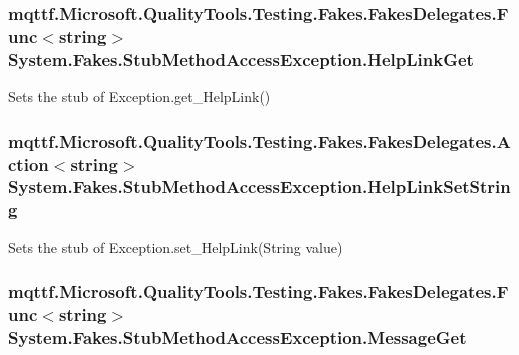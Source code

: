 \hypertarget{class_system_1_1_fakes_1_1_stub_method_access_exception_a0f5613a9a38d11a0047361aa8dcf5e5b}{
\subsubsection[{Help\-Link\-Get}]{\setlength{\rightskip}{0pt plus 5cm}mqttf.\-Microsoft.\-Quality\-Tools.\-Testing.\-Fakes.\-Fakes\-Delegates.\-Func$<$string$>$ System.\-Fakes.\-Stub\-Method\-Access\-Exception.\-Help\-Link\-Get}}\label{class_system_1_1_fakes_1_1_stub_method_access_exception_a0f5613a9a38d11a0047361aa8dcf5e5b}


Sets the stub of Exception.\-get\-\_\-\-Help\-Link()

\hypertarget{class_system_1_1_fakes_1_1_stub_method_access_exception_ac2a9ea451e23e897aa54f2ea9961489d}{
\subsubsection[{Help\-Link\-Set\-String}]{\setlength{\rightskip}{0pt plus 5cm}mqttf.\-Microsoft.\-Quality\-Tools.\-Testing.\-Fakes.\-Fakes\-Delegates.\-Action$<$string$>$ System.\-Fakes.\-Stub\-Method\-Access\-Exception.\-Help\-Link\-Set\-String}}\label{class_system_1_1_fakes_1_1_stub_method_access_exception_ac2a9ea451e23e897aa54f2ea9961489d}


Sets the stub of Exception.\-set\-\_\-\-Help\-Link(\-String value)

\hypertarget{class_system_1_1_fakes_1_1_stub_method_access_exception_a08d53ea3c8f1dd9a1345109e07bd9c14}{
\subsubsection[{Message\-Get}]{\setlength{\rightskip}{0pt plus 5cm}mqttf.\-Microsoft.\-Quality\-Tools.\-Testing.\-Fakes.\-Fakes\-Delegates.\-Func$<$string$>$ System.\-Fakes.\-Stub\-Method\-Access\-Exception.\-Message\-Get}}\label{class_system_1_1_fakes_1_1_stub_method_access_exception_a08d53ea3c8f1dd9a1345109e07bd9c14}


